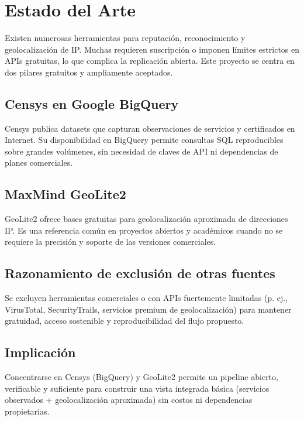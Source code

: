 \section{Estado del Arte}

Existen numerosas herramientas para reputación, reconocimiento y geolocalización de IP. Muchas requieren suscripción o imponen límites estrictos en APIs gratuitas, lo que complica la replicación abierta. Este proyecto se centra en dos pilares gratuitos y ampliamente aceptados.

\subsection{Censys en Google BigQuery}

Censys publica datasets que capturan observaciones de servicios y certificados en Internet. Su disponibilidad en BigQuery permite consultas SQL reproducibles sobre grandes volúmenes, sin necesidad de claves de API ni dependencias de planes comerciales.

\subsection{MaxMind GeoLite2}

GeoLite2 ofrece bases gratuitas para geolocalización aproximada de direcciones IP. Es una referencia común en proyectos abiertos y académicos cuando no se requiere la precisión y soporte de las versiones comerciales.

\subsection{Razonamiento de exclusión de otras fuentes}

Se excluyen herramientas comerciales o con APIs fuertemente limitadas (p. ej., VirusTotal, SecurityTrails, servicios premium de geolocalización) para mantener gratuidad, acceso sostenible y reproducibilidad del flujo propuesto.

\subsection{Implicación}

Concentrarse en Censys (BigQuery) y GeoLite2 permite un pipeline abierto, verificable y suficiente para construir una vista integrada básica (servicios observados + geolocalización aproximada) sin costos ni dependencias propietarias.
